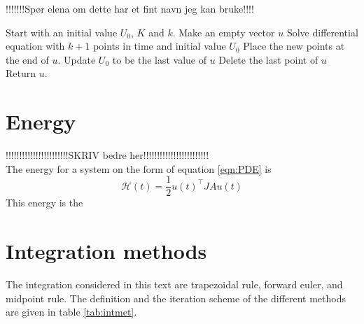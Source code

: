 \begin{algorithm} [h!]
\begin{algorithmic} \caption{!!!!!!!Spør elena om dette har et fint navn jeg kan bruke!!!!} \label{alg:Kversusk}  
\STATE Start with an initial value $U_0$, $K$ and $k$.
\STATE Make an empty vector $u$
   \STATE Solve differential equation with $k+1$ points in time and initial value $U_0$
   \STATE Place the new points at the end of $u$.
   \STATE Update $U_0$ to be the last value of $u$ 
   \STATE Delete the last point of $u$
\ENDFOR
\STATE Return $u$.
\end{algorithmic} 
\end{algorithm}

\section{Energy}%
!!!!!!!!!!!!!!!!!!!!!!!SKRIV bedre her!!!!!!!!!!!!!!!!!!!!!!!!\\
The energy for a system on the form of equation \ref{eqn:PDE} is \citep{luli}
\begin{equation}
\mathcal{H} (t) = \frac{1}{2} u(t)^\top J A u(t)
\label{eqn:energy}
\end{equation}
This energy is the 

\section{Integration methods}%

The integration considered in this text are trapezoidal rule, forward euler, and midpoint rule. The definition and the iteration scheme of the different methods are given in table \ref{tab:intmet}. 

